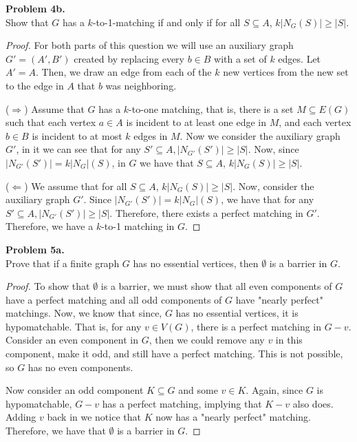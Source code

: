 \documentclass{article}
\newcommand{\size}[1]{|#1|}
\newenvironment{hwproof}[2]
{
    \textbf{Problem #1.}\\
    #2
    \begin{proof}
}{
    \end{proof}
}
\begin{document}
\begin{hwproof}
    {4b}
    {Show that $G$ has a $k$-to-1-matching if and only if for all $S \subseteq A$, $k\size{N_G(S)} \geq \size{S}$.}

    For both parts of this question we will use an auxiliary graph $G' = (A', B')$ created by replacing every $b \in B$ with a set of $k$ edges. Let $A' = A$. Then, we draw an
    edge from each of the $k$ new vertices from the new set to the edge in $A$ that $b$ was neighboring.

    ($\Rightarrow$) Assume that $G$ has a $k$-to-one matching, that is, there is a set $M \subseteq E(G)$ such that each vertex $a \in A$ is incident to at least one edge in $M$,
    and each vertex $b \in B$ is incident to at most $k$ edges in $M$. Now we consider the auxiliary graph $G'$, in it we can see that for any
    $S' \subseteq A, \size{N_{G'}(S')} \geq \size{S}$. Now, since $\size{N_{G'}(S')} = k\size{N_G}(S)$, in $G$ we have that $S \subseteq A$, $k\size{N_G(S)} \geq \size{S}$.

    ($\Leftarrow$) We assume that for all $S \subseteq A$, $k\size{N_G(S)} \geq \size{S}$. Now, consider the auxiliary graph $G'$. Since $\size{N_{G'}(S')} = k\size{N_G}(S)$,
    we have that for any $S' \subseteq A, \size{N_{G'}(S')} \geq \size{S}$. Therefore, there exists a perfect matching in $G'$. Therefore, we have a $k$-to-1 matching in $G$.

\end{hwproof}

\begin{hwproof}
    {5a}
    {Prove that if a finite graph $G$ has no essential vertices, then $\emptyset$ is a barrier in $G$.}

    To show that $\emptyset$ is a barrier, we must show that all even components of $G$ have a perfect matching and all odd components of $G$ have "nearly perfect" matchings.
    Now, we know that since, $G$ has no essential vertices, it is hypomatchable. That is, for any $v \in V(G)$, there is a perfect matching in $G - v$. Consider an even component
    in $G$, then we could remove any $v$ in this component, make it odd, and still have a perfect matching. This is not possible, so $G$ has no even components.

    Now consider an odd component $K \subseteq G$ and some $v \in K$. Again, since $G$ is hypomatchable, $G-v$ has a perfect matching, implying that $K - v$ also does.
    Adding $v$ back in we notice that $K$ now has a "nearly perfect" matching. Therefore, we have that $\emptyset$ is a barrier in $G$.
\end{hwproof}
\end{document}
